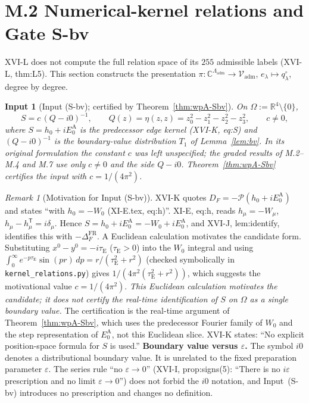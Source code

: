 \documentclass{article}
\newtheorem{inputstatement}[proposition]{Input}
\theoremstyle{remark}
\newtheorem{remark}[proposition]{Remark}
\newcommand{\Pc}{\mathcal P}
\begin{document}
\section{M.2 Numerical-kernel relations and Gate S-bv}
\label{sec:m2}

XVI-L does not compute the full relation space of its $255$ admissible labels (XVI-L, thm:L5).
This section constructs the presentation $\pi:\mathbb C^{\Lambda_{\mathrm{adm}}}\to\mathcal V_{\mathrm{adm}}$, $e_\lambda\mapsto q^\circ_\lambda$, degree by degree.

\begin{inputstatement}[Input (S-bv); certified by Theorem~\ref{thm:wpA-Sbv}]
\label{inp:Sbv}
On $\Omega:=\mathbb R^4\setminus\{0\}$,
\[
S=c\,(Q-i0)^{-1},\qquad Q(z)=\eta(z,z)=z_0^2-z_1^2-z_2^2-z_3^2,\qquad c\neq0,
\]
where $S=h_0+iE_0^{\mathrm A}$ is the predecessor edge kernel (XVI-K, eq:S) and $(Q-i0)^{-1}$ is the boundary-value distribution $T_1$ of Lemma~\ref{lem:bv}.
In its original formulation the constant $c$ was left unspecified; the graded results of M.2--M.4 and M.7 use only $c\neq0$ and the side $Q-i0$.
Theorem~\ref{thm:wpA-Sbv} certifies the input with $c=1/(4\pi^2)$.
\end{inputstatement}

\begin{remark}[Motivation for Input (S-bv)]
\label{rem:Sbv-motivation}
XVI-K quotes $D_F=-\Pc(h_0+iE_0^{\mathrm A})$ and states ``with $h_0=-W_0$ (XI-E.tex, eq:h)''.
XI-E, eq:h, reads $h_\mu=-W_\mu$, $h_\mu-h_\mu^{\mathsf T}=i\delta_\mu$.
Hence $S=h_0+iE_0^{\mathrm A}=-W_0+iE_0^{\mathrm A}$, and XVI-J, lem:identify, identifies this with $-\Delta_F^{\mathrm{FR}}$.
A Euclidean calculation motivates the candidate form.
Substituting $x^0-y^0=-i\tau_{\mathrm E}$ ($\tau_{\mathrm E}>0$) into the $W_0$ integral and using $\int_0^\infty e^{-p\tau_{\mathrm E}}\sin(pr)\,dp=r/(\tau_{\mathrm E}^2+r^2)$ (checked symbolically in \texttt{kernel\_relations.py}) gives $1/(4\pi^2(\tau_{\mathrm E}^2+r^2))$, which suggests the motivational value $c=1/(4\pi^2)$.
\emph{This Euclidean calculation motivates the candidate; it does not certify the real-time identification of $S$ on $\Omega$ as a single boundary value.}
The certification is the real-time argument of Theorem~\ref{thm:wpA-Sbv}, which uses the predecessor Fourier family of $W_0$ and the step representation of $E_0^{\mathrm A}$, not this Euclidean slice.
XVI-K states: ``No explicit position-space formula for \(S\) is used.''
\textbf{Boundary value versus $\varepsilon$.} The symbol $i0$ denotes a distributional boundary value.
It is unrelated to the fixed preparation parameter $\varepsilon$.
The series rule ``no $\varepsilon\to0$'' (XVI-I, prop:signs(5): ``There is no \(i\varepsilon\) prescription and no limit \(\varepsilon\to0\)'') does not forbid the $i0$ notation, and Input~(S-bv) introduces no prescription and changes no definition.
\end{remark}
\end{document}
